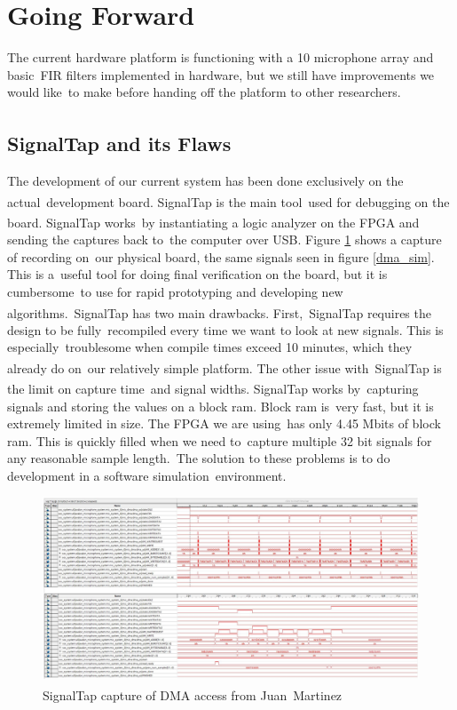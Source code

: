 \documentclass{article}
\begin{document}
\section{Going Forward}
The current hardware platform is functioning with a 10 microphone array and basic\
FIR filters implemented in hardware, but we still have improvements we would like\
to make before handing off the platform to other researchers.

\subsection{SignalTap\textsuperscript{\textregistered{}} and its Flaws}
The development of our current system has been done exclusively on the actual\
development board. SignalTap\textsuperscript{\textregistered{}} is the main tool\
used for debugging on the board. SignalTap\textsuperscript{\textregistered{}} works\
by instantiating a logic analyzer on the FPGA and sending the captures back to\
the computer over USB. Figure \ref{signaltap} shows a capture of recording on\
our physical board, the same signals seen in figure \ref{dma_sim}. This is a\
useful tool for doing final verification on the board, but it is cumbersome\
to use for rapid prototyping and developing new algorithms.\
SignalTap\textsuperscript{\textregistered{}} has two main drawbacks. First,\
SignalTap\textsuperscript{\textregistered{}} requires the design to be fully\
recompiled every time we want to look at new signals.  This is especially\
troublesome when compile times exceed 10 minutes, which they already do on\
our relatively simple platform. The other issue with\
SignalTap\textsuperscript{\textregistered{}} is the limit on capture time\
and signal widths. SignalTap\textsuperscript{\textregistered{}} works by\
capturing signals and storing the values on a block ram. Block ram is\
very fast, but it is extremely limited in size. The FPGA we are using\
has only 4.45 Mbits of block ram. This is quickly filled when we need to\
capture multiple 32 bit signals for any reasonable sample length.\
The solution to these problems is to do development in a software simulation\ 
environment.

\begin{figure}[ht]
	\begin{center}
	\includegraphics[scale=.28]{pictures/signaltap.png}
	\caption{SignalTap\textsuperscript{\textregistered} capture of DMA access from Juan\
	Martinez}
	\label{signaltap}
	\end{center}
\end{figure}
\end{document}
